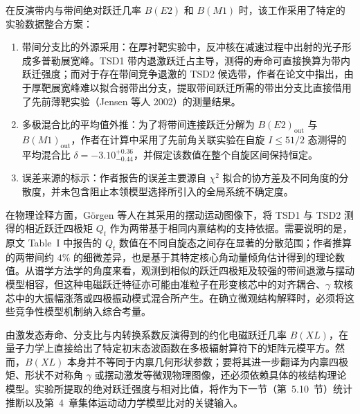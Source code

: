 在反演带内与带间绝对跃迁几率 $B(E2)$ 和 $B(M1)$ 时，该工作采用了特定的实验数据整合方案：
\begin{enumerate}
\item 带间分支比的外源采用：在厚衬靶实验中，反冲核在减速过程中出射的光子形成多普勒展宽峰。TSD1 带内退激跃迁占主导，测得的寿命可直接换算为带内跃迁强度；而对于存在带间竞争退激的 TSD2 候选带，作者在论文中指出，由于厚靶展宽峰难以拟合弱带出分支，提取带间跃迁所需的带出分支比直接借用了先前薄靶实验（Jensen 等人 2002）的测量结果。
\item 多极混合比的平均值外推：为了将带间连接跃迁分解为 $B(E2)_{\text{out}}$ 与 $B(M1)_{\text{out}}$，作者在计算中采用了先前角关联实验在自旋 $I \le 51/2$ 态测得的平均混合比 $\delta = -3.10^{+0.36}_{-0.44}$，并假定该数值在整个自旋区间保持恒定。
\item 误差来源的标示：作者报告的误差主要源自 $\chi^2$ 拟合的协方差及不同角度的分散度，并未包含阻止本领模型选择所引入的全局系统不确定度。
\end{enumerate}

在物理诠释方面，Görgen 等人在其采用的摆动运动图像下，将 TSD1 与 TSD2 测得的相近跃迁四极矩 $Q_t$ 作为两带基于相同内禀结构的支持依据。需要说明的是，原文 Table~I 中报告的 $Q_t$ 数值在不同自旋态之间存在显著的分散范围；作者推算的两带间约 $4\%$ 的细微差异，也是基于其特定核心角动量倾角估计得到的理论数值。从谱学方法学的角度来看，观测到相似的跃迁四极矩及较强的带间退激与摆动模型相容，但这种电磁跃迁特征亦可能由准粒子在形变核芯中的对齐耦合、$\gamma$ 软核芯中的大振幅涨落或四极振动模式混合所产生。在确立微观结构解释时，必须将这些竞争性模型机制纳入综合考量。

由激发态寿命、分支比与内转换系数反演得到的约化电磁跃迁几率 $B(XL)$，在量子力学上直接给出了特定初末态波函数在多极辐射算符下的矩阵元模平方。然而，$B(XL)$ 本身并不等同于内禀几何形状参数；要将其进一步翻译为内禀四极矩、形状不对称角 $\gamma$ 或摆动激发等微观物理图像，还必须依赖具体的核结构理论模型。实验所提取的绝对跃迁强度与相对比值，将作为下一节（第~5.10~节）统计推断以及第~4~章集体运动动力学模型比对的关键输入。
